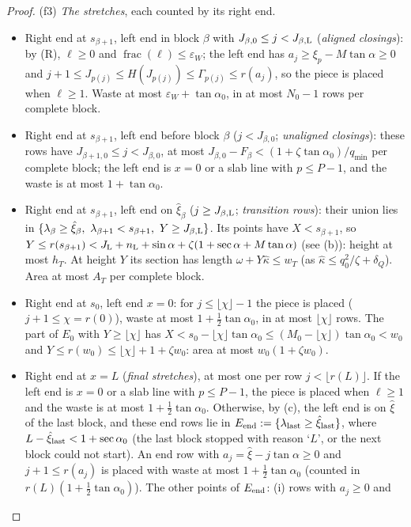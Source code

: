 \documentclass[11pt]{amsart}
\newcommand{\sa}{\sin\alpha}
\newcommand{\ta}{\tan\alpha}
\newcommand{\se}{\sec\alpha}
\newcommand{\taz}{\tan\alpha_0}
\newcommand{\sez}{\sec\alpha_0}
\theoremstyle{definition}
\theoremstyle{remark}
\numberwithin{equation}{section}
\begin{document}
\begin{proof}
(f3) \emph{The stretches}, each counted by its right end.
\begin{itemize}
\item Right end at $s_{\beta+1}$, left end in block $\beta$ with $J_{\beta,0}\le j<J_{\beta,\rm L}$ (\emph{aligned
closings}): by (R), $\ell\ge0$ and $\operatorname{frac}(\ell)\le\varepsilon_W$; the left end has
$a_j\ge\xi_p-M\ta\ge0$ and $j+1\le J_{p(j)}\le H(J_{p(j)})\le\Gamma_{p(j)}\le r(a_j)$, so the piece is placed when
$\ell\ge1$. Waste at most $\varepsilon_W+\taz$, in at most $N_0-1$ rows per complete block.
\item Right end at $s_{\beta+1}$, left end before block $\beta$ ($j<J_{\beta,0}$; \emph{unaligned closings}): these rows
have $J_{\beta+1,0}\le j<J_{\beta,0}$, at most $J_{\beta,0}-F_{\beta}<(1+\zeta\taz)/q_{\min}$ per complete block; the
left end is $x=0$ or a slab line with $p\le P-1$, and the waste is at most $1+\taz$.
\item Right end at $s_{\beta+1}$, left end on $\hat\xi_\beta$ ($j\ge J_{\beta,\rm L}$; \emph{transition rows}): their
union lies in $\{\lambda_\beta\ge\hat\xi_\beta,\ \lambda_{\beta+1}<s_{\beta+1},\ Y\ge J_{\beta,\rm L}\}$. Its points have
$X<s_{\beta+1}$, so $Y\le r(s_{\beta+1})<J_{\rm L}+n_{\rm L}+\sa+\zeta(1+\se+M\ta)$ (see (b)): height at most $h_T$.
At height $Y$ its section has length $\omega+Y\hat\kappa\le w_T$ (as $\hat\kappa\le q_0^2/\zeta+\delta_Q$). Area at most
$A_T$ per complete block.
\item Right end at $s_0$, left end $x=0$: for $j\le\lfloor\chi\rfloor-1$ the piece is placed ($j+1\le\chi=r(0)$), waste
at most $1+\frac12\taz$, in at most $\lfloor\chi\rfloor$ rows. The part of $E_0$ with $Y\ge\lfloor\chi\rfloor$ has
$X<s_0-\lfloor\chi\rfloor\taz\le(M_0-\lfloor\chi\rfloor)\taz<w_0$ and $Y\le r(w_0)\le\lfloor\chi\rfloor+1+\zeta w_0$:
area at most $w_0(1+\zeta w_0)$.
\item Right end at $x=L$ (\emph{final stretches}), at most one per row $j<\lfloor r(L)\rfloor$. If the left end is $x=0$ or
a slab line with $p\le P-1$, the piece is placed when $\ell\ge1$ and the waste is at most $1+\frac12\taz$. Otherwise, by
(c), the left end is on $\hat\xi$ of the last block, and these end rows lie in $E_{\rm end}:=\{\lambda_{\rm last}\ge
\hat\xi_{\rm last}\}$, where $L-\hat\xi_{\rm last}<1+\sez$ (the last block stopped with reason `$L$', or the next block
could not start). An end row with $a_j=\hat\xi-j\ta\ge0$ and $j+1\le r(a_j)$ is placed with waste at most
$1+\frac12\taz$ (counted in $r(L)(1+\frac12\taz)$). The other points of $E_{\rm end}$: (i) rows with $a_j\ge0$ and

\end{itemize}
\end{proof}
\end{document}
